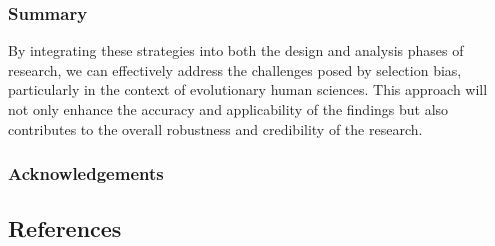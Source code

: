 \documentclass[
  singlecolumn,
  9pt]{article}
\begin{document}
\subsubsection{Summary}\label{summary}

By integrating these strategies into both the design and analysis phases
of research, we can effectively address the challenges posed by
selection bias, particularly in the context of evolutionary human
sciences. This approach will not only enhance the accuracy and
applicability of the findings but also contributes to the overall
robustness and credibility of the research.

\subsubsection{Acknowledgements}\label{acknowledgements}

\subsection*{References}\label{references}
\end{document}
